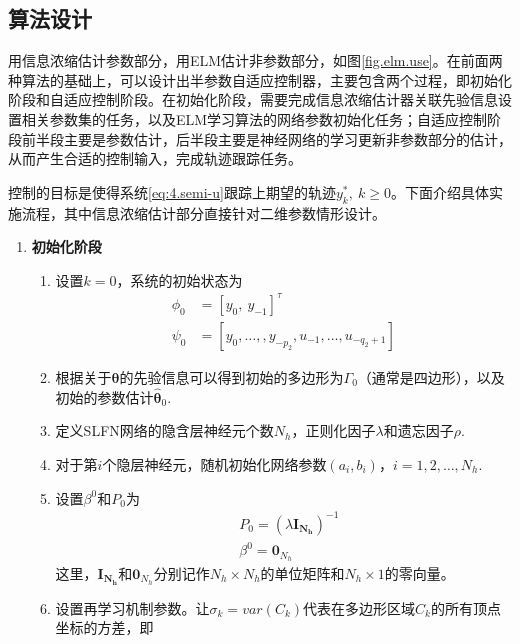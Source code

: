 \subsection{算法设计}\label{sect:4.3.1}
用信息浓缩估计参数部分，用ELM估计非参数部分，如图\ref{fig.elm.use}。在前面两种算法的基础上，可以设计出半参数自适应控制器，主要包含两个过程，即初始化阶段和自适应控制阶段。在初始化阶段，需要完成信息浓缩估计器关联先验信息设置相关参数集的任务，以及ELM学习算法的网络参数初始化任务；自适应控制阶段前半段主要是参数估计，后半段主要是神经网络的学习更新非参数部分的估计，从而产生合适的控制输入，完成轨迹跟踪任务。

控制的目标是使得系统\ref{eq:4.semi-u}跟踪上期望的轨迹$y^{*}_{k},\ k\geq0$。下面介绍具体实施流程，其中信息浓缩估计部分直接针对二维参数情形设计。

\begin{enumerate}%
\item \textbf{初始化阶段}
\begin{enumerate}%
\item 设置$k=0$，系统的初始状态为
\begin{equation*}
\begin{split}%
\phi_{0}&=[y_{0},\ y_{-1}]^{\tau}\\
\psi_{0}&=[y_{0},\dots,,y_{-p_{2}},u_{-1},\dots,u_{-q_{2}+1}]
\end{split}
\end{equation*}
\item 根据关于$\bm{\theta}$的先验信息可以得到初始的多边形为$\Gamma_{0}$（通常是四边形），以及初始的参数估计$\hat{\bm{\theta}}_{0}$.
\item 定义SLFN网络的隐含层神经元个数$N_{h}$，正则化因子$\lambda$和遗忘因子$\rho$.
\item 对于第$i$个隐层神经元，随机初始化网络参数$(a_{i},b_{i})$，$i=1,2,\ldots,N_{h}$.
\item 设置$\beta^{0}$和$P_{0}$为
\begin{equation}\label{eq.elm0}
\begin{split}%
& P_{0} = (\lambda \bm{I_{N_{h}}})^{-1} \\
& \beta^{0} = \bm{0}_{N_{h}}
\end{split}
\end{equation}
这里，$\bm{I_{N_{h}}}$和$\bm{0}_{N_{h}}$分别记作$N_{h}\times N_{h}$的单位矩阵和$N_{h}\times1$的零向量。
\item 设置再学习机制参数。让$\sigma_{k}=var(C_{k})$代表在多边形区域$C_{k}$的所有顶点坐标的方差，即
\begin{equation}

\end{equation}
\end{enumerate}
\end{enumerate}
